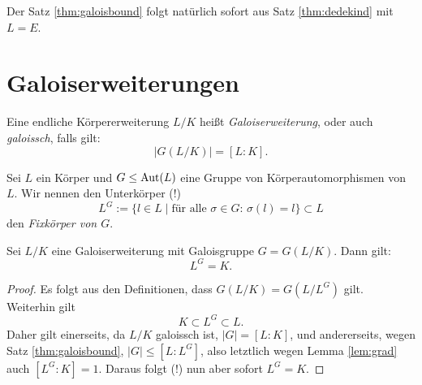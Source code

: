 \documentclass{book}
\begin{document}
Der Satz \ref{thm:galoisbound} folgt natürlich sofort aus Satz \ref{thm:dedekind} mit $L = E$. 

\section{Galoiserweiterungen}%
\label{sec:galoiserweiterungen}

\begin{defi}
    \label{defi:galois}
    Eine endliche Körpererweiterung $L/K$ heißt \emph{Galoiserweiterung}, oder
    auch \emph{galoissch}, falls gilt:
    \[
        |G(L/K)| = [L:K].
    \]
\end{defi}

Sei $L$ ein Körper und $G \le \operatorname{Aut}(L)$ eine Gruppe von Körperautomorphismen von $L$. Wir nennen den Unterkörper (!)
\[
    L^G := \{ l \in L \; |\; \text{für alle $\sigma \in G$: $\sigma(l) = l$} \} \subset L
\]
den \emph{Fixkörper von $G$}.

\begin{thm}
    \label{thm:fix}
    Sei $L/K$ eine Galoiserweiterung mit Galoisgruppe $G = G(L/K)$. Dann gilt:
    \[
        L^G = K.
    \]
\end{thm}
\begin{proof}
    Es folgt aus den Definitionen, dass $G(L/K) = G(L/L^G)$ gilt. Weiterhin gilt
    \[
        K \subset L^G \subset L.
    \]
    Daher gilt einerseits, da $L/K$ galoissch ist, $|G| = [L:K]$, und andererseits,
    wegen Satz \ref{thm:galoisbound}, $|G| \le [L:L^G]$, also letztlich wegen
    Lemma \ref{lem:grad} auch $[L^G:K] = 1$. Daraus folgt (!) nun aber sofort
    $L^G = K$. 
\end{proof}
\end{document}
